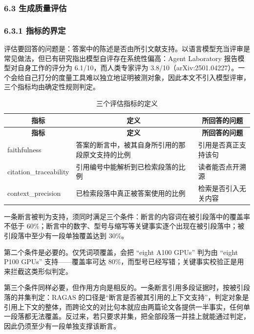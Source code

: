 \documentclass[UTF8,fontset=windows,zihao=5,a4paper]{ctexart}
\begin{document}
\subsubsection*{6.3 生成质量评估}
\subsubsection*{6.3.1 指标的界定}
评估要回答的问题是：答案中的陈述是否由所引文献支持。以语言模型充当评审是常见做法，但已有研究指出模型自评存在系统性偏高：Agent Laboratory 报告模型对自身工作的评分为 6.1/10，而人类专家评为 3.8/10（arXiv:2501.04227）。一个会给自己打分的度量工具难以独立地证明被测对象，因此本文不引入模型评审，三个指标均由确定性规则判定。

\begin{longtable}{@{}p{}p{}p{}@{}}
\caption{三个评估指标的定义}\\
\toprule
\multicolumn{1}{c}{\textbf{指标}} & \multicolumn{1}{c}{\textbf{定义}} & \multicolumn{1}{c}{\textbf{所回答的问题}} \\
\midrule
\endfirsthead
\toprule
\multicolumn{1}{c}{\textbf{指标}} & \multicolumn{1}{c}{\textbf{定义}} & \multicolumn{1}{c}{\textbf{所回答的问题}} \\
\midrule
\endhead
\bottomrule
\endfoot
faithfulness & 答案的断言中，被其自身所引用的那段原文支持的比例 & 引用是否真正支持该句 \\
citation\_\allowbreak{}traceability & 引用编号中能解析到已检索段落的比例 & 读者能否点开溯源 \\
context\_\allowbreak{}precision & 已检索段落中真正被答案使用的比例 & 检索是否引入无关内容 \\
\end{longtable}

一条断言被判为支持，须同时满足三个条件：断言的内容词在被引段落中的覆盖率不低于 60\%；断言中的数字、型号与缩写等关键事实逐个出现在被引段落中；被引段落中至少有一段单独覆盖达到 30\%。

第二个条件是必要的。仅凭词项覆盖，会把 “eight A100 GPUs” 判为由 “eight P100 GPUs” 支持——覆盖率可达 80\%，而型号已经写错；关键事实校验正是用来拦截这类形似判定。

第三个条件同样必要，但作用方向是相反的。一条断言引用多段证据时，按被引段落的并集判定：RAGAS 的口径是“断言是否被其引用的上下文支持”，判定对象是引用上下文的整体，而跨论文的对比句本就应由两篇论文各提供一半事实，任何单一段落都无法覆盖。反过来，若只要求并集，把全部段落一并挂上就能通过判定，因此仍须至少有一段单独支撑该断言。
\end{document}
